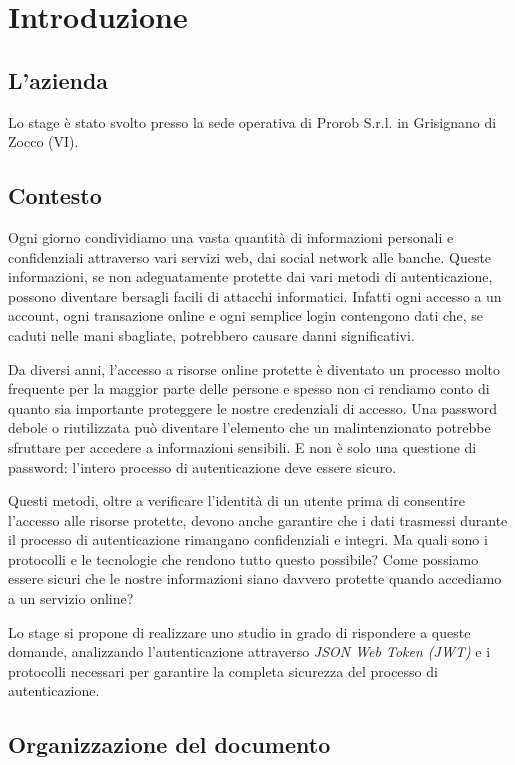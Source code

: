 \chapter{Introduzione}
\label{cap:introduzione}


\section{L'azienda}

Lo stage è stato svolto presso la sede operativa di Prorob S.r.l. in Grisignano di Zocco (VI).


\section{Contesto}

Ogni giorno condividiamo una vasta quantità di informazioni personali e confidenziali attraverso vari servizi web, dai social network alle banche.
Queste informazioni, se non adeguatamente protette dai vari metodi di autenticazione, possono diventare bersagli facili di attacchi informatici.
Infatti ogni accesso a un account, ogni transazione online e ogni semplice login contengono dati che, se caduti nelle mani sbagliate, potrebbero causare danni significativi.

Da diversi anni, l'accesso a risorse online protette è diventato un processo molto frequente per la maggior parte delle persone e spesso non ci rendiamo conto di quanto sia importante proteggere le nostre credenziali di accesso.
Una password debole o riutilizzata può diventare l'elemento che un malintenzionato potrebbe sfruttare per accedere a informazioni sensibili.
E non è solo una questione di password: l'intero processo di autenticazione deve essere sicuro.

Questi metodi, oltre a verificare l'identità di un utente prima di consentire l'accesso alle risorse protette, devono anche garantire che i dati trasmessi durante il processo di autenticazione rimangano confidenziali e integri.
Ma quali sono i protocolli e le tecnologie che rendono tutto questo possibile? Come possiamo essere sicuri che le nostre informazioni siano davvero protette quando accediamo a un servizio online?

Lo stage si propone di realizzare uno studio in grado di rispondere a queste domande, analizzando l'autenticazione attraverso \emph{JSON Web Token (JWT)} e i protocolli necessari per garantire la completa sicurezza del processo di autenticazione.


\section{Organizzazione del documento}
\label{sec:organizzazione-documento}

